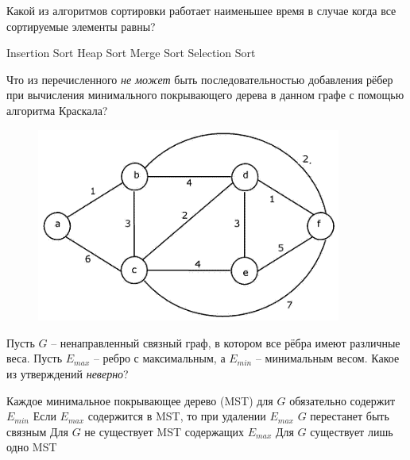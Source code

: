 \documentclass[12pt]{exam}
\begin{document}
\begin{questions}
\question[1] Какой из алгоритмов сортировки работает наименьшее время в случае когда все сортируемые элементы равны?
\begin{checkboxes}
\CorrectChoice Insertion Sort
\choice Heap Sort
\choice Merge Sort
\choice Selection Sort
\end{checkboxes}

\question[2] Что из перечисленного {\em не может} быть последовательностью добавления рёбер при вычисления минимального покрывающего дерева в данном графе с помощью алгоритма Краскала?
\begin{figure}[H]
  \begin{center}
    \includegraphics[width=10cm]{mst.png}
  \end{center}
\end{figure}
\begin{checkboxes}
\end{checkboxes}


\question[2] Пусть $G$ -- ненаправленный связный граф, в котором все рёбра имеют различные веса. Пусть $E_{max}$ -- ребро с максимальным, а $E_{min}$ -- минимальным весом. Какое из утверждений {\em неверно}?
\begin{checkboxes}
\choice Каждое минимальное покрывающее дерево (MST) для $G$ обязательно содержит $E_{min}$
\choice Если $E_{max}$ содержится в MST, то при удалении $E_{max}$ $G$ перестанет быть связным
\choice Для $G$ не существует MST содержащих $E_{max}$
\choice Для $G$ существует лишь одно MST
\end{checkboxes}


\end{questions}
\end{document}
